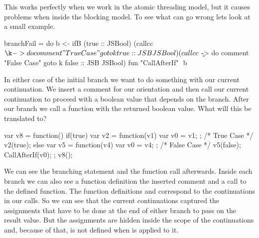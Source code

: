 This works perfectly when we work in the atomic threading model,
but it causes problems when inside the blocking model. To 
see what can go wrong lets look at a small example.
\begin{Code}
branchFail = do
  b <- ifB (true :: JSBool)
           (callcc $ \k -> do comment "True Case"
                              goto k true :: JSB JSBool)
           (callcc $ \k -> do comment "False Case"
                              goto k false :: JSB JSBool)
  fun "CallAfterIf" $$ b
\end{Code}
In either case of the initial branch we want to do something
with our current continuation. We insert a comment for 
our orientation and then call our current continuation to 
proceed with a boolean value that depends on the branch.
After our branch we call a function with the returned boolean value.
What will this be translated to?
\begin{Code}
var v8 = function() {
  if(true){
    var v2 = function(v1) { var v0 = v1; };
    /* True Case */
    v2(true);
  } else {
    var v5 = function(v4) { var v0 = v4; };
    /* False Case */
    v5(false);
  }
  CallAfterIf(v0);
};
v8();
\end{Code}
We can see the branching statement and the function call afterwards.
Inside each branch we can also see a function definition the inserted 
comment and a call to the defined function. The function definitions 
 and  correspond to the continuations  in 
our  calls. So we can see that the current continuations 
captured the assignments that have to be done at the end of either branch 
to pass on the result value. But the assignments are hidden inside 
the scope of the continuations and, because of that,  is 
not defined when  is applied to it.

